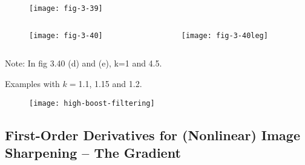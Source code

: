
\begin{frame}
\begin{figure}
\centering
\texttt{[image: fig-3-39]}
\end{figure}
\end{frame}


\begin{frame}
\begin{columns}
\begin{column}{.25\textwidth}
\begin{figure}
\centering
\texttt{[image: fig-3-40]}
\end{figure}
\end{column}
\begin{column}{.15\textwidth}
\begin{figure}
\centering
\texttt{[image: fig-3-40leg]}
\end{figure}
\end{column}
\end{columns}
Note: In fig 3.40 (d) and (e), k=1 and 4.5.
\end{frame}


\begin{frame}
Examples with $k=$1.1, 1.15 and 1.2.
\begin{figure}
\centering
\texttt{[image: high-boost-filtering]}
\end{figure}
\end{frame}


\subsection{First-Order Derivatives for (Nonlinear) Image Sharpening -- The Gradient}


